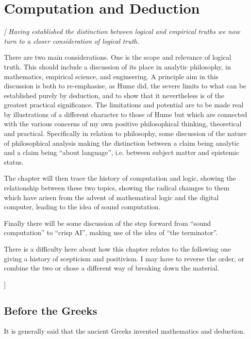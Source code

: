 
\chapter{Computation and Deduction}\label{ComputationAndDeduction}

{\it[
Having established the distinction between logical and empirical
truths we now turn to a closer consideration of logical truth. 

There are two main considerations.
One is the scope and relevance of logical truth.
This should include a discussion of its place in analytic philosophy,
in mathematics, empirical science, and engineering. 
A principle aim in this discussion is both to re-emphasise, as Hume
did, the severe limits to what can be established purely by deduction,
and to show that it nevertheless is of the greatest practical
significance. 
The limitations and potential are to be made real by illustrations of
a different character to those of Hume but which are connected with
the various concerns of my own positive philosophical thinking,
theoretical and practical. 
Specifically in relation to philosophy, some discussion of the nature
of philosophical analysis making the distinction between a claim being
analytic and a claim being ``about language'', i.e. between subject
matter and epistemic status. 

The chapter will then trace the history of computation and logic,
showing the relationship between these two topics, showing the radical
chamges to them which have arisen from the advent of mathematical
logic and the digital computer, leading to the idea of sound
computation. 

Finally there will be some discussion of the step forward from ``sound
computation'' to ``crisp AI'', making use of the idea of ``the
terminator''.

There is a difficulty here about how this chapter relates to the
following one giving a history of scepticism and positivism.
I may have to reverse the order, or combine the two or chose a
different way of breaking down the material.

]}

\section{Before the Greeks}

It is generally said that the ancient Greeks invented mathematics and
deduction.

